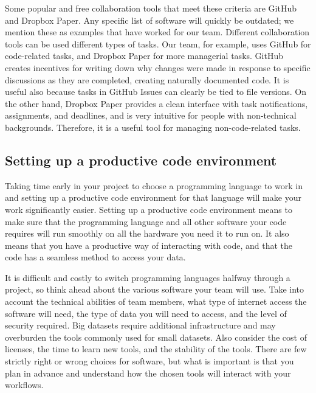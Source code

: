 Some popular and free collaboration tools that meet these criteria are
GitHub and Dropbox Paper.
Any specific list of software will quickly be outdated;
we mention these as examples that have worked for our team.
Different collaboration tools can be used different types of tasks.
Our team, for example, uses GitHub for code-related tasks,
and Dropbox Paper for more managerial tasks.
GitHub creates incentives for writing down why changes were made
in response to specific discussions
as they are completed, creating naturally documented code.
It is useful also because tasks in GitHub Issues can clearly be tied to file versions.
On the other hand, Dropbox Paper provides a clean interface with task notifications,
assignments, and deadlines,
and is very intuitive for people with non-technical backgrounds.
Therefore, it is a useful tool for managing non-code-related tasks.

\subsection{Setting up a productive code environment}

Taking time early in your project to choose a programming language to work in and
setting up a productive code environment for that language
will make your work significantly easier.
Setting up a productive code environment means to
make sure that the programming language and all other software your code requires
will run smoothly on all the hardware you need it to run on.
It also means that you have a productive way of interacting with code,
and that the code has a seamless method to access your data.

It is difficult and costly to switch programming languages halfway through a project,
so think ahead about the various software your team will use.
Take into account the technical abilities of team members,
what type of internet access the software will need,
the type of data you will need to access,
and the level of security required.
Big datasets require additional infrastructure and may overburden
the tools commonly used for small datasets.
Also consider the cost of licenses, the time to learn new tools,
and the stability of the tools.
There are few strictly right or wrong choices for software,
but what is important is that you plan in advance
and understand how the chosen tools will interact with your workflows.

